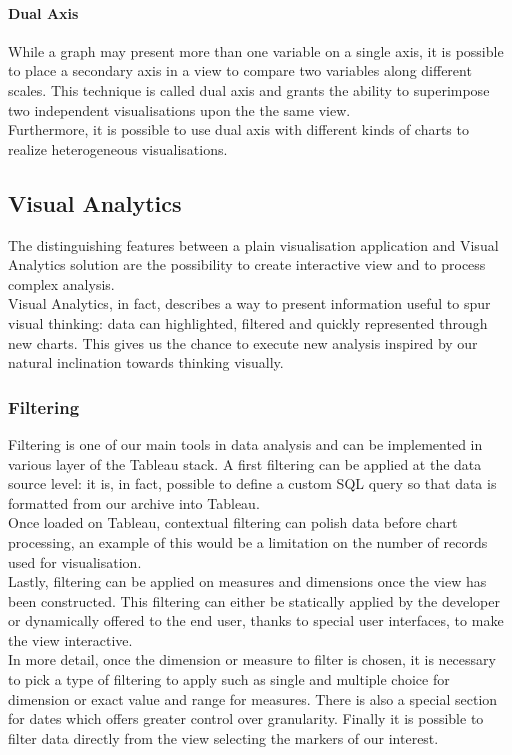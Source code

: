 \paragraph{Dual Axis}
While a graph may present more than one variable on a single axis, it is possible to place a secondary axis in a view to compare two variables along different scales. This technique is called dual axis and grants the ability to superimpose two independent visualisations upon the the same view.\\
Furthermore, it is possible to use dual axis with different kinds of charts to realize heterogeneous visualisations.

\subsection{Visual Analytics}

The distinguishing features between a plain visualisation application and Visual Analytics solution are the possibility to create interactive view and to process complex analysis.\\
Visual Analytics, in fact, describes a way to present information useful to spur visual thinking: data can highlighted, filtered and quickly represented through new charts. This gives us the chance to execute new analysis inspired by our natural inclination towards thinking visually.

\subsubsection{Filtering}

Filtering is one of our main tools in data analysis and can be implemented in various layer of the Tableau stack.
A first filtering can be applied at the data source level: it is, in fact, possible to define a custom SQL query so that data is formatted from our archive into Tableau.\\
Once loaded on Tableau, contextual filtering can polish data before chart processing, an example of this would be a limitation on the number of records used for visualisation.\\
Lastly, filtering can be applied on measures and dimensions once the view has been constructed. This filtering can either be statically applied by the developer or dynamically offered to the end user, thanks to special user interfaces, to make the view interactive.
\\
In more detail, once the dimension or measure to filter is chosen, it is necessary to pick a type of filtering to apply such as single and multiple choice for dimension or exact value and range for measures. There is also a special section for dates which offers greater control over granularity.
Finally it is possible to filter data directly from the view selecting the markers of our interest.

